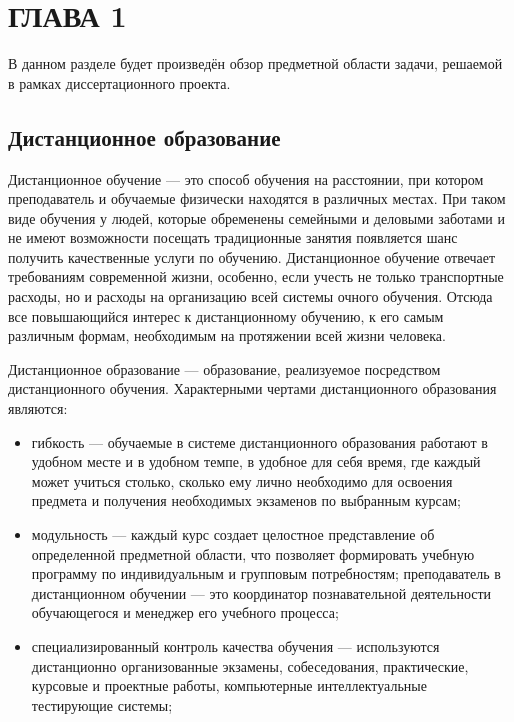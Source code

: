 \section{ГЛАВА 1}


В данном разделе будет произведён обзор предметной области задачи,
решаемой в рамках диссертационного проекта.

\subsection{Дистанционное образование}

Дистанционное обучение — это способ обучения на расстоянии, при котором преподаватель и
обучаемые физически находятся в различных местах. При таком виде обучения у людей, которые
обременены семейными и деловыми заботами и не имеют возможности посещать традиционные занятия
появляется шанс получить качественные услуги по обучению. Дистанционное обучение отвечает
требованиям современной жизни, особенно, если учесть не только транспортные расходы, но и
расходы на организацию всей системы очного обучения. Отсюда все повышающийся интерес к
дистанционному обучению, к его самым различным формам, необходимым на протяжении
всей жизни человека.\cite{moluch}

Дистанционное образование — образование, реализуемое посредством дистанционного обучения.
Характерными чертами дистанционного образования являются:

\begin{itemize}
  \item гибкость — обучаемые в системе дистанционного образования работают в удобном месте и в удобном темпе,
  в удобное для себя время, где каждый может учиться столько, сколько ему лично необходимо для
  освоения предмета и получения необходимых экзаменов по выбранным курсам;
  \item модульность — каждый курс создает целостное представление об определенной предметной области,
  что позволяет формировать учебную программу по индивидуальным и групповым потребностям; преподаватель в дистанционном обучении — это координатор познавательной деятельности
  обучающегося и менеджер его учебного процесса;
  \item специализированный контроль качества обучения —
  используются дистанционно организованные экзамены, собеседования, практические, курсовые и
  проектные работы, компьютерные интеллектуальные тестирующие системы;
\end{itemize}

